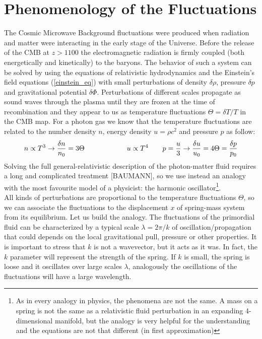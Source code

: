 \documentclass{article}
\begin{document}
\section{Phenomenology of the Fluctuations}
The Cosmic Microwave Background fluctuations were produced when radiation and matter were interacting in the early stage of the Universe.
Before the release of the CMB at $z > 1100$ the electromagnetic radiation is firmly coupled (both energetically and kinetically) to the baryons.
The behavior of such a system can be solved by using the equations of relativistic hydrodynamics and the Einstein's field equations (\ref{einstein_eq}) with small perturbations of density $\delta \rho$, pressure $\delta p$ and gravitational potential  $\delta \Phi$.
Perturbations of different scales propagate as sound waves through the plasma until they are frozen at the time of recombination and they appear to us as temperature fluctuations $\Theta = \delta T /T$ in the CMB map.
For a photon gas we know that the temperature fluctuations are related to the number density $n$, energy density $u = \rho c^2$ and pressure $p$ as follow:
\begin{equation}
n \propto T ^3 \rightarrow \dfrac{\delta n}{n_0} = 3 \Theta \qquad \qquad \qquad
 u \propto T^4  \qquad p  = \dfrac{u}{3} \rightarrow \dfrac{\delta u}{u_0} = 4 \Theta = \dfrac{\delta p}{p_0} \notag
\end{equation}
Solving the full general-relativistic description of the photon-matter fluid requires a long and complicated treatment [BAUMANN], so we use instead an analogy with the most favourite model of a physicist: the harmonic oscillator\footnote{As in every analogy in physics, the phenomena are not the same. A mass on a spring is not the same as a relativistic fluid perturbation in an expanding 4-dimensional manifold, but the analogy is very helpful for the understanding and the equations are not that different (in first approximation)}.\\
All kinds of perturbations are proportional to the temperature fluctuations $\Theta$, so we  can associate the fluctuations to the displacement $x$ of spring-mass system from its equilibrium.
Let us build the analogy.
The fluctuations of the primordial fluid can be characterized by a typical scale $\lambda = 2 \pi /k$ of oscillation/propagation that could depends on the local gravitational pull, pressure or other properties.
It is important to stress that $k$ is not a wavevector, but it acts as it was. 
In fact, the $k$ parameter will represent the strength of the spring.
If $k$ is small, the spring is loose and it  oscillates over large scales $\lambda$, analogously the oscillations of the fluctuations will have a large wavelength. \\ 
\end{document}
